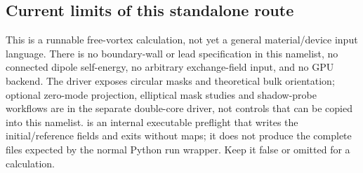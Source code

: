 \subsection{Current limits of this standalone route}

This is a runnable free-vortex calculation, not yet a general material/device
input language. There is no boundary-wall or lead specification in this
namelist, no connected dipole self-energy, no arbitrary exchange-field input,
and no GPU backend. The driver exposes circular masks and theoretical bulk
orientation; optional zero-mode projection, elliptical mask studies and
shadow-probe workflows are in the separate double-core driver, not controls
that can be copied into this namelist.  is an
internal executable preflight that writes the initial/reference fields and
exits without maps; it does not produce the complete files expected by the
normal Python run wrapper. Keep it false or omitted for a calculation.
